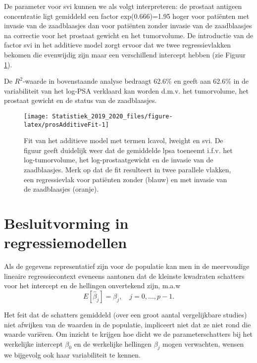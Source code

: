 \documentclass[12pt,dutch,coursenotes]{book}
\theoremstyle{definition}
\theoremstyle{definition}
\theoremstyle{definition}
\theoremstyle{remark}
\begin{document}
De parameter voor svi kunnen we als volgt interpreteren: de prostaat
antigeen concentratie ligt gemiddeld een factor exp(0.666)=1.95 hoger
voor patiënten met invasie van de zaadblaasjes dan voor patiënten zonder
invasie van de zaadblaasjes na correctie voor het prostaat gewicht en
het tumorvolume. De introductie van de factor svi in het additieve model
zorgt ervoor dat we twee regressievlakken bekomen die evenwijdig zijn
maar een verschillend intercept hebben (zie Figuur
\ref{fig:prosAdditiveFit}).

De \(R^2\)-waarde in bovenstaande analyse bedraagt 62.6\% en geeft aan
62.6\% in de variabiliteit van het log-PSA verklaard kan worden d.m.v.
het tumorvolume, het prostaat gewicht en de status van de zaadblaasjes.

\begin{figure}

{\centering \texttt{[image: Statistiek\_2019\_2020\_files/figure-latex/prosAdditiveFit-1]} 

}

\caption{Fit van het additieve model met termen lcavol, lweight en svi. De figuur geeft duidelijk weer dat de gemiddelde lpsa toeneemt i.f.v. het log-tumorvolume, het log-prostaatgewicht en de invasie van de zaadblaasjes. Merk op dat de fit resulteert in twee parallele vlakken, een regressievlak voor patiënten zonder (blauw) en met invasie van de zaadblaasjes (oranje).}\label{fig:prosAdditiveFit}
\end{figure}

\section{Besluitvorming in
regressiemodellen}\label{besluitvorming-in-regressiemodellen}

Als de gegevens representatief zijn voor de populatie kan men in de
meervoudige lineaire regressiecontext eveneens aantonen dat de kleinste
kwadraten schatters voor het intercept en de hellingen onvertekend zijn,
m.a.w \[E[\hat \beta_j]=\beta_j,\quad j=0,\ldots,p-1.\]

Het feit dat de schatters gemiddeld (over een groot aantal vergelijkbare
studies) niet afwijken van de waarden in de populatie, impliceert niet
dat ze niet rond die waarde variëren. Om inzicht te krijgen hoe dicht we
de parameterschatters bij het werkelijke intercept \(\beta_0\) en de
werkelijke hellingen \(\beta_j\) mogen verwachten, wensen we bijgevolg
ook haar variabiliteit te kennen.
\end{document}

